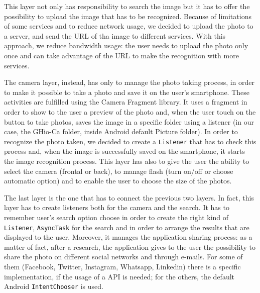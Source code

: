 This layer not only has responsibility to search the image but it has to offer
the possibility to upload the image that has to be recognized. Because of
limitations of some services and to reduce network usage, we decided to upload 
the photo to a server, and send the URL of tha image to different services.
With this approach, we reduce bandwidth usage: the user needs to upload the
photo only once and can take advantage of the URL to make the recognition with
more services.

The camera layer, instead, has only to manage the photo taking process, in order
to make it possible to take a photo and save it on the user's smartphone. These
activities are fulfilled using the Camera Fragment library. It uses a fragment
in order to show to the user a preview of the photo and, when the user touch on
the button to take photos, saves the image in a specific folder using a
listener (in our case, the GHio-Ca folder, inside Android default Picture
folder). In order to recognize the photo taken, we decided to create a
\texttt{Listener} that has to check this process and, when the image is 
successfully saved on the smartphone, it starts the image recognition process.
This layer has also to give the user the ability to select the camera (frontal
or back), to manage flash (turn on/off or choose automatic option) and to enable
the user to choose the size of the photos.

The last layer is the one that has to connect the previous two layers. In fact,
this layer has to create listeners both for the camera and the search. It has
to remember user's search option choose in order to create the right kind of
\texttt{Listener}, \texttt{AsyncTask} for the search and in order to arrange the 
results that are displayed to the user. Moreover, it manages the application
sharing process: as a matter of fact, after a research, the application gives 
to the user the possibility to share the photo on different social networks and
through e-mails. For some of them (Facebook, Twitter, Instagram, Whatsapp,
Linkedin) there is a specific implementation, if the usage of a API is needed;
for the others, the default Android \texttt{IntentChooser} is used.
